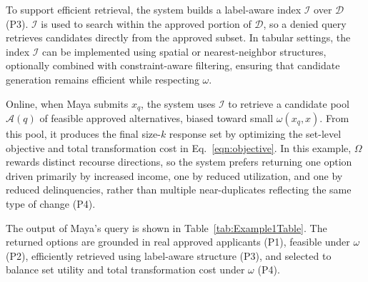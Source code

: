 To support efficient retrieval, the system builds a label-aware index $\mathcal{I}$ over $\mathcal{D}$ (P3). $\mathcal{I}$ is used to search within the approved portion of $\mathcal{D}$, so a denied query retrieves candidates directly from the approved subset. In tabular settings, the index $\mathcal{I}$ can be implemented using spatial or nearest-neighbor structures, optionally combined with constraint-aware filtering, ensuring that candidate generation remains efficient while respecting $\omega$.


Online, when Maya submits $x_q$, the system uses $\mathcal I$ to retrieve a candidate pool $\mathcal A(q)$ of feasible approved alternatives, biased toward small $\omega(x_q,x)$. From this pool, it produces the final size-$k$ response set by optimizing the set-level objective and total transformation cost in Eq.~\eqref{eqn:objective}. In this example, $\Omega$ rewards distinct recourse directions, so the system prefers returning one option driven primarily by increased income, one by reduced utilization, and one by reduced delinquencies, rather than multiple near-duplicates reflecting the same type of change (P4).



The output of Maya's query is shown in Table~\ref{tab:Example1Table}. The returned options are grounded in real approved applicants (P1), feasible under $\omega$ (P2), efficiently retrieved using label-aware structure (P3), and selected to balance set utility and total transformation cost under $\omega$ (P4).
